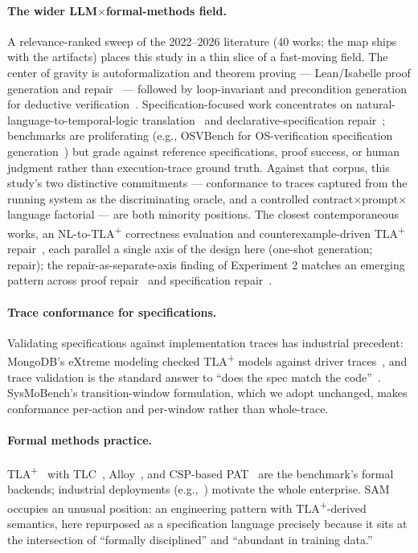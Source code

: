 \documentclass[11pt]{article}
\newcommand{\tlaplus}{TLA\texorpdfstring{\textsuperscript{+}}{+}}
\begin{document}
\paragraph{The wider LLM$\times$formal-methods field.}
A relevance-ranked sweep of the 2022--2026 literature (40 works; the map
ships with the artifacts) places this study in a thin slice of a
fast-moving field. The center of gravity is autoformalization and theorem
proving --- Lean/Isabelle proof generation and
repair~\cite{wu2022autoformalization,yang2023leandojo,first2023baldur} ---
followed by loop-invariant and precondition generation for deductive
verification~\cite{chakraborty2023ranking}. Specification-focused work
concentrates on natural-language-to-temporal-logic
translation~\cite{cosler2023nl2spec} and declarative-specification
repair~\cite{ese2025repair}; benchmarks are proliferating (e.g., OSVBench
for OS-verification specification generation~\cite{osvbench2025}) but grade
against reference specifications, proof success, or human judgment rather
than execution-trace ground truth. Against that corpus, this study's two
distinctive commitments --- conformance to traces captured from the running
system as the discriminating oracle, and a controlled
contract$\times$prompt$\times$language factorial --- are both minority
positions. The closest contemporaneous works, an NL-to-\tlaplus{}
correctness evaluation and counterexample-driven \tlaplus{}
repair~\cite{nl2tla2026,tracefix2026}, each parallel a single axis of the
design here (one-shot generation; repair); the repair-as-separate-axis
finding of Experiment 2 matches an emerging pattern across proof
repair~\cite{first2023baldur} and specification
repair~\cite{ese2025repair}.

\paragraph{Trace conformance for specifications.}
Validating specifications against implementation traces has industrial
precedent: MongoDB's eXtreme modeling checked \tlaplus{} models against
driver traces~\cite{davis2020extreme}, and trace validation is the standard
answer to ``does the spec match the code''~\cite{sysmobench}. SysMoBench's
transition-window formulation, which we adopt unchanged, makes conformance
per-action and per-window rather than whole-trace.

\paragraph{Formal methods practice.}
\tlaplus{}~\cite{lamport2002specifying} with TLC~\cite{yu1999tlc},
Alloy~\cite{jackson2002alloy}, and CSP-based PAT~\cite{sun2009pat} are the
benchmark's formal backends; industrial deployments
(e.g.,~\cite{newcombe2015amazon}) motivate the whole enterprise. SAM
\cite{sam,dubray2016infoq} occupies an unusual position: an engineering
pattern with \tlaplus{}-derived semantics, here repurposed as a
specification language precisely because it sits at the intersection of
``formally disciplined'' and ``abundant in training data.''
\end{document}
